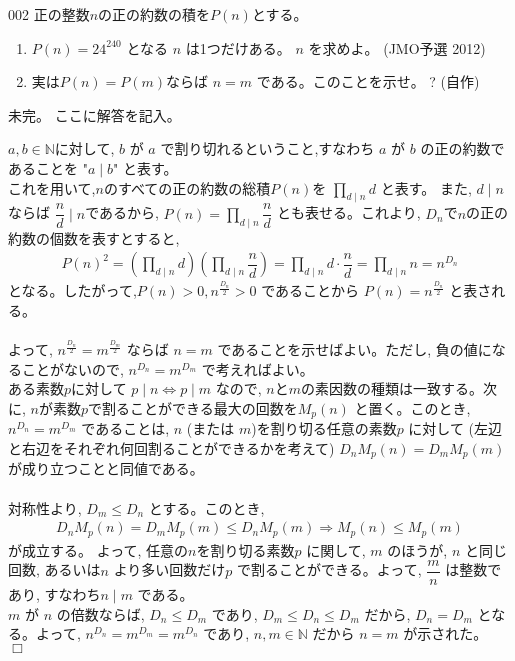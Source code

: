 \begin{thm}{002}{}{}
 正の整数$n$の正の約数の積を$P(n)$とする。
 \begin{enumerate}
  \item $P(n)=24^{240}$ となる $n$ は1つだけある。 $n$ を求めよ。  (JMO予選 2012)
  \item 実は$P(n)=P(m)$ならば $n=m$ である。このことを示せ。 \hosi ? (自作)
 \end{enumerate}
\end{thm}
未完。
ここに解答を記入。

$a,b\in\mathbb{N}$に対して, $b$ が $a$ で割り切れるということ,すなわち $a$ が $b$ の正の約数であることを "$a\mid b$" と表す。\\
これを用いて,$n$のすべての正の約数の総積$P(n)$を $\displaystyle\prod_{d\mid n}d$ と表す。 また, $d\mid n$ならば $\dfrac{n}{d}\mid n$であるから, $P(n)=\displaystyle\prod_{d\mid n}\dfrac{n}{d}$ とも表せる。これより, $D_n$で$n$の正の約数の個数を表すとすると,
\begin{eqnarray*}
P(n)^2 = \left(\displaystyle\prod_{d\mid n}d\right)\left(\displaystyle\prod_{d\mid n}\dfrac{n}{d}\right) = \displaystyle\prod_{d\mid n}d\cdot \dfrac{n}{d} = \displaystyle\prod_{d\mid n}n = n^{D_n}
\end{eqnarray*}
となる。したがって,$P(n)>0, n^{\frac{D_n}{2}}>0$ であることから $P(n)=n^{\frac{D_n}{2}}$ と表される。\\
\\
よって, $n^{\frac{D_n}{2}}=m^{\frac{D_m}{2}}$ ならば $n=m$ であることを示せばよい。ただし, 負の値になることがないので, $n^{D_n}=m^{D_m}$ で考えればよい。\\
ある素数$p$に対して $p\mid n\Leftrightarrow p\mid m$ なので, $n$と$m$の素因数の種類は一致する。次に, $n$が素数$p$で割ることができる最大の回数を$M_p(n)$ と置く。このとき, $n^{D_n}=m^{D_m}$ であることは, $n$ (または $m$)を割り切る任意の素数$p$ に対して (左辺と右辺をそれぞれ何回割ることができるかを考えて) $D_nM_p(n)=D_mM_p(m)$ が成り立つことと同値である。\\
\\
対称性より, $D_m\le D_n$ とする。このとき,
\begin{eqnarray*} 
D_nM_p(n)=D_mM_p(m)\le D_nM_p(m) \Rightarrow M_p(n)\le M_p(m)
\end{eqnarray*}
が成立する。 よって, 任意の$n$を割り切る素数$p$ に関して, $m$ のほうが, $n$ と同じ回数, あるいは$n$ より多い回数だけ$p$ で割ることができる。よって, $\dfrac{m}{n}$ は整数であり, すなわち$n\mid m$ である。\\
$m$ が $n$ の倍数ならば,  $D_n\le D_m$ であり, $D_m\le D_n\le D_m$ だから, $D_n=D_m$ となる。よって, $n^{D_n}=m^{D_m}=m^{D_n}$ であり, $n,m\in\mathbb{N}$ だから $n=m$ が示された。　　$\Box$
